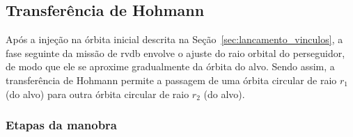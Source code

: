 \subsection{Transferência de Hohmann}
\label{sec:transf_hohmann}

Após a injeção na órbita inicial descrita na Seção~\ref{sec:lancamento_vinculos}, a fase seguinte da missão de \gls{rvdb} envolve o ajuste do raio orbital do perseguidor, de modo que ele se aproxime gradualmente da órbita do alvo.
Sendo assim, a transferência de Hohmann permite a passagem de uma órbita circular de raio $r_1$ (do alvo) para outra órbita circular de raio $r_2$ (do alvo).








\subsubsection{Etapas da manobra}

